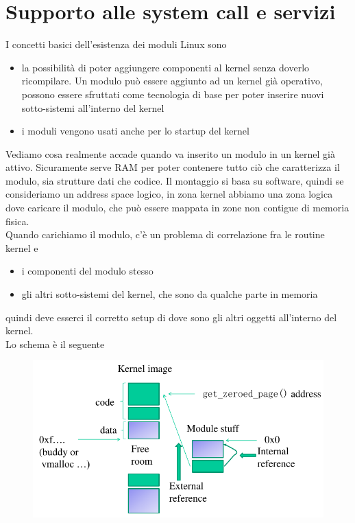 \documentclass[12pt, oneside]{extbook}
\begin{document}
\section{Supporto alle system call e servizi}
I concetti basici dell'esistenza dei moduli Linux sono
\begin{itemize}
\item la possibilità di poter aggiungere componenti al kernel senza doverlo ricompilare. Un modulo può essere aggiunto ad un kernel già operativo, possono essere sfruttati come tecnologia di base per poter inserire nuovi sotto-sistemi all'interno del kernel
\item i moduli vengono usati anche per lo startup del kernel
\end{itemize}
Vediamo cosa realmente accade quando va inserito un modulo in un kernel già attivo. Sicuramente serve RAM per poter contenere tutto ciò che caratterizza il modulo, sia strutture dati che codice. Il montaggio si basa su software, quindi se consideriamo un address space logico, in zona kernel abbiamo una zona logica dove caricare il modulo, che può essere mappata in zone non contigue di memoria fisica.\\Quando carichiamo il modulo, c'è un problema di correlazione fra le routine kernel e 
\begin{itemize}
\item i componenti del modulo stesso
\item gli altri sotto-sistemi del kernel, che sono da qualche parte in memoria
\end{itemize}
quindi deve esserci il corretto setup di dove sono gli altri oggetti all'interno del kernel.\\Lo schema è il seguente
\begin{figure}[!h]
	\includegraphics[scale=0.4]{immagini/module_mount_scheme.png}
\end{figure}
\end{document}
